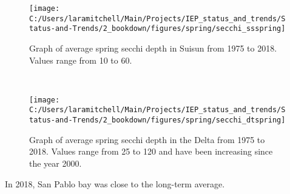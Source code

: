 \documentclass[
]{book}
\begin{document}
\begin{panel-grid}
\begin{columns-nocenter}
\begin{column40}
\end{column40}

\begin{column800}

\begin{expand}

\begin{figure}
\texttt{[image: C:/Users/laramitchell/Main/Projects/IEP\_status\_and\_trends/Status-and-Trends/2\_bookdown/figures/spring/secchi\_ssspring]} \caption{Graph of average spring secchi depth in Suisun from 1975 to 2018. Values range from 10 to 60.}\label{fig:unnamed-chunk-9}
\end{figure}

\end{expand}

\end{column800}

\begin{column40}

~

\end{column40}

\begin{column800}

\begin{expand}

\begin{figure}
\texttt{[image: C:/Users/laramitchell/Main/Projects/IEP\_status\_and\_trends/Status-and-Trends/2\_bookdown/figures/spring/secchi\_dtspring]} \caption{Graph of average spring secchi depth in the Delta from 1975 to 2018. Values range from 25 to 120 and have been increasing since the year 2000.}\label{fig:unnamed-chunk-10}
\end{figure}

\end{expand}

\end{column800}

\end{columns-nocenter}

\begin{columns-nocenter}

\begin{column800}

In 2018, San Pablo bay was close to the long-term average.

\end{column800}

\begin{column40}


\end{column40}
\end{columns-nocenter}
\end{panel-grid}
\end{document}
